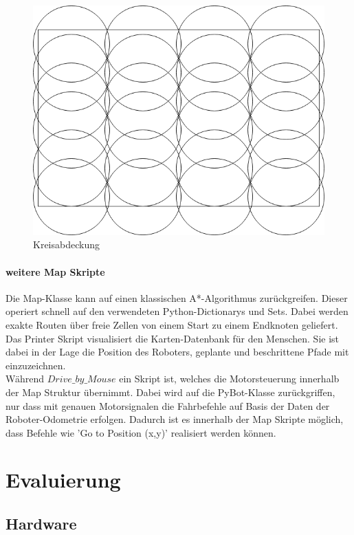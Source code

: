 \documentclass[twoside,12pt,a4paper]{report}
\begin{document}
	\begin{figure}[!htb]
		\centering
		\includegraphics[scale=0.25]{images/Kreis.png}
		\caption{Kreisabdeckung}
	\end{figure}
	
	\FloatBarrier
	\subsubsection{weitere Map Skripte}
	Die Map-Klasse kann auf einen klassischen A*-Algorithmus zurückgreifen. Dieser operiert schnell auf den verwendeten Python-Dictionarys und Sets. Dabei werden exakte Routen über freie Zellen von einem Start zu einem Endknoten geliefert. \\
	Das Printer Skript visualisiert die Karten-Datenbank für den Menschen. Sie ist dabei in der Lage die Position des Roboters, geplante  und beschrittene Pfade mit einzuzeichnen.\\
	Während $Drive\_by\_Mouse$ ein Skript ist, welches die Motorsteuerung innerhalb der Map Struktur übernimmt. Dabei wird auf die PyBot-Klasse zurückgriffen, nur dass mit genauen Motorsignalen die Fahrbefehle auf Basis der Daten der Roboter-Odometrie erfolgen. Dadurch ist es innerhalb der Map Skripte möglich, dass Befehle wie 'Go to Position (x,y)' realisiert werden können. 
	
	\chapter{Evaluierung}
	\section{Hardware}
\end{document}
